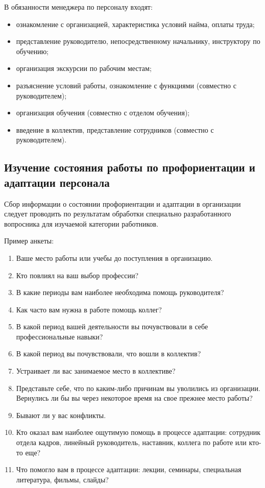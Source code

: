 \documentclass[a4paper,12pt,oneside,final]{extarticle}
\numberwithin{equation}{section}
\begin{document}
В обязанности менеджера по персоналу входят:
\begin{itemize}
	\item ознакомление с организацией, характеристика условий найма, оплаты труда;
	\item представление руководителю, непосредственному начальнику, инструктору по обучению;
	\item организация экскурсии по рабочим местам;
	\item разъяснение условий работы, ознакомление с функциями (совместно с руководителем);
	\item организация обучения (совместно с отделом обучения);
	\item введение в коллектив, представление сотрудников (совместно с руководителем).
\end{itemize}

\subsection{Изучение состояния работы по профориентации и адаптации персонала}
Сбор информации о состоянии профориентации и адаптации в организации следует проводить по результатам обработки специально разработанного вопросника для изучаемой категории работников.

Пример анкеты:
\begin{enumerate}
	\item Ваше место работы или учебы до поступления в организацию.
	\item Кто повлиял на ваш выбор профессии?
	\item В какие периоды вам наиболее необходима помощь руководителя?
	\item Как часто вам нужна в работе помощь коллег?
	\item В какой период вашей деятельности вы почувствовали в себе профессиональные навыки?
	\item В какой период вы почувствовали, что вошли в коллектив?
	\item Устраивает ли вас занимаемое место в коллективе?
	\item Представьте себе, что по каким-либо причинам вы уволились из организации. 
	Вернулись ли бы вы через некоторое время на свое прежнее место работы?
	\item Бывают ли у вас конфликты.
	\item Кто оказал вам наиболее ощутимую помощь в процессе адаптации: сотрудник отдела кадров, линейный руководитель, наставник, коллега по работе или кто-то еще? 
	\item Что помогло вам в процессе адаптации: лекции, семинары, специальная литература, фильмы, слайды?
\end{enumerate}
\end{document}
